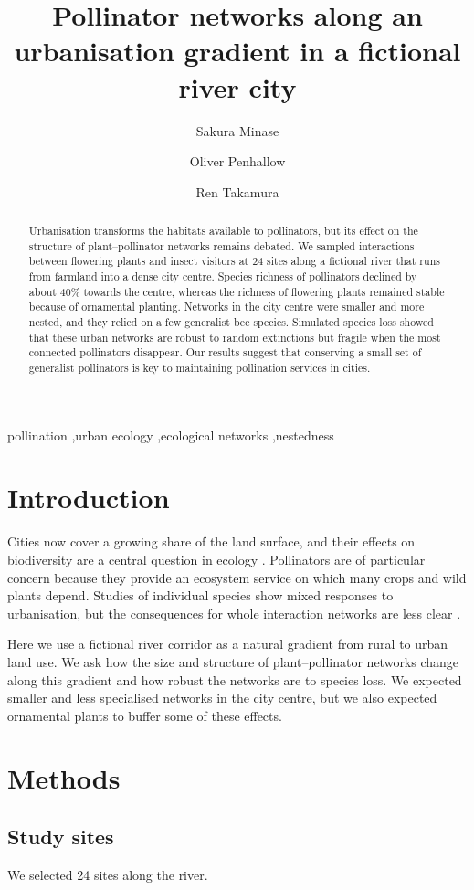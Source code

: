 \documentclass[5p,times]{elsarticle}
\begin{document}
\begin{frontmatter}
\title{Pollinator networks along an urbanisation gradient in a fictional river city}
\author[ku]{Sakura Minase}
\author[nw]{Oliver Penhallow}
\author[ku]{Ren Takamura}
\begin{abstract}
Urbanisation transforms the habitats available to pollinators, but its effect on the structure of plant--pollinator networks remains debated.
We sampled interactions between flowering plants and insect visitors at 24 sites along a fictional river that runs from farmland into a dense city centre.
Species richness of pollinators declined by about 40\% towards the centre, whereas the richness of flowering plants remained stable because of ornamental planting.
Networks in the city centre were smaller and more nested, and they relied on a few generalist bee species.
Simulated species loss showed that these urban networks are robust to random extinctions but fragile when the most connected pollinators disappear.
Our results suggest that conserving a small set of generalist pollinators is key to maintaining pollination services in cities.
\end{abstract}
\begin{keyword}
pollination \sep urban ecology \sep ecological networks \sep nestedness
\end{keyword}
\end{frontmatter}
\section{Introduction}
Cities now cover a growing share of the land surface, and their effects on biodiversity are a central question in ecology \cite{minase2021,penhallow2022}.
Pollinators are of particular concern because they provide an ecosystem service on which many crops and wild plants depend.
Studies of individual species show mixed responses to urbanisation, but the consequences for whole interaction networks are less clear \cite{takamura2023}.

Here we use a fictional river corridor as a natural gradient from rural to urban land use.
We ask how the size and structure of plant--pollinator networks change along this gradient and how robust the networks are to species loss.
We expected smaller and less specialised networks in the city centre, but we also expected ornamental plants to buffer some of these effects.

\section{Methods}
\subsection{Study sites}
We selected 24 sites along the river.


\end{document}
